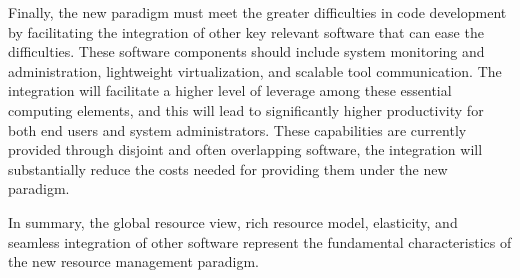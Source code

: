 Finally, the new paradigm must meet the greater difficulties
in code development by facilitating the integration 
of other key relevant software that can ease the difficulties. 
These software components should include system monitoring
and administration, lightweight virtualization,
and scalable tool communication.
The integration will facilitate a higher level of
leverage among these essential computing elements,
and this will lead to significantly higher productivity
for both end users and system administrators.
These capabilities are currently provided
through disjoint and often overlapping software,
the integration will substantially reduce the costs
needed for providing them under the new paradigm. 

In summary, the global resource view, rich resource model,
elasticity, and seamless integration of other software 
represent the fundamental characteristics of the new
 resource management paradigm.  

